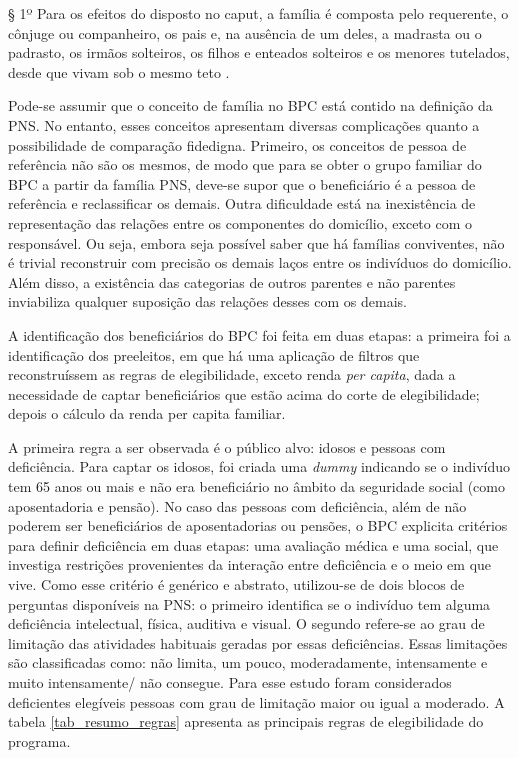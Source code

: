 \documentclass[
	12pt,				%
	openright,			%
	twoside,			%
	a4paper,			%
	english,			%
	french,				%
	spanish,			%
	brazil				%
	]{abntex2}
\begin{document}
	\begin{citacao}
		§ 1º Para os efeitos do disposto no caput, a família é composta pelo requerente, o cônjuge ou companheiro, os pais e, na ausência de um deles, a madrasta ou o padrasto, os irmãos solteiros, os filhos e enteados solteiros e os menores tutelados, desde que vivam sob o mesmo teto \cite[art.20]{loas2011}.
	\end{citacao}
	
	Pode-se assumir que o conceito de família no BPC está contido na definição da PNS. No entanto, esses conceitos apresentam diversas complicações quanto a  possibilidade de comparação fidedigna. Primeiro, os conceitos de pessoa de referência não são os mesmos, de modo que para se obter o grupo familiar do BPC a partir da família PNS, deve-se supor que o beneficiário é a pessoa de referência e reclassificar os demais. Outra dificuldade está na inexistência de representação das relações entre os componentes do domicílio, exceto com o responsável. Ou seja, embora seja possível saber que há famílias conviventes, não é trivial reconstruir com precisão os demais laços entre os indivíduos do domicílio. Além disso, a existência das categorias de outros parentes e não parentes inviabiliza qualquer suposição das relações desses com os demais. 
	
	A identificação dos beneficiários do BPC foi feita em duas etapas: a primeira foi a identificação dos preeleitos, em que há uma aplicação de filtros que reconstruíssem as regras de elegibilidade, exceto renda \textit{per capita}, dada a necessidade de captar beneficiários que estão acima do corte de elegibilidade; depois o cálculo da renda per capita familiar.
	
	A primeira regra a ser observada é o público alvo: idosos e pessoas com deficiência. Para captar os idosos, foi criada uma \textit{dummy} indicando se o indivíduo tem 65 anos ou mais e não era beneficiário no âmbito da seguridade social (como aposentadoria e pensão). No caso das pessoas com deficiência, além de não poderem ser beneficiários de aposentadorias ou pensões, o BPC explicita critérios para definir deficiência em duas etapas: uma avaliação médica e uma social, que investiga restrições provenientes da interação entre deficiência e o meio em que vive. Como esse critério é genérico e abstrato, utilizou-se de dois blocos de perguntas disponíveis na PNS: o primeiro identifica se o indivíduo tem alguma deficiência intelectual, física, auditiva e visual. O segundo refere-se ao grau de limitação das atividades habituais geradas por essas deficiências. Essas limitações são  classificadas como: não limita, um pouco, moderadamente, intensamente e muito intensamente/ não consegue. Para esse estudo foram considerados deficientes elegíveis pessoas com grau de limitação maior ou igual a moderado. A tabela \ref*{tab_resumo_regras} apresenta as principais regras de elegibilidade do programa.
	
\end{document}
